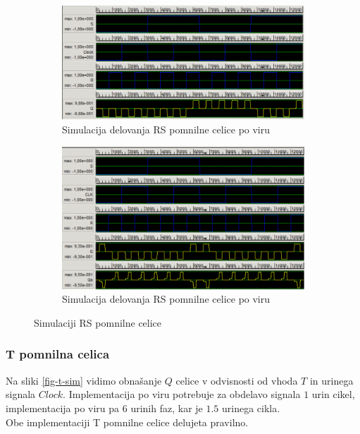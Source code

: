 \documentclass[a4paper, 11pt]{article}
\begin{document}
\begin{figure}[h!]
	\begin{subfigure}[b]{\textwidth}
	\includegraphics[width=\textwidth]{../img/vir_4/sim_sr.png}
	\caption{Simulacija delovanja RS pomnilne celice po viru \cite{quantum_dot}}
	\label{fig-rs-1-sim}
	\end{subfigure}
	\begin{subfigure}[b]{\textwidth}
	\includegraphics[width=\textwidth]{../img/vir_5/sim_rs.png}
	\caption{Simulacija delovanja RS pomnilne celice po viru \cite{a_novel_approach}}
	\label{fig-rs-2-sim}
	\end{subfigure}
	\caption{Simulaciji RS pomnilne celice}
	\label{fig-rs-sim}
\end{figure}

\subsubsection{T pomnilna celica}
Na sliki \ref{fig-t-sim} vidimo obnašanje $Q$ celice v odvisnosti od vhoda $T$ in urinega signala $Clock$.
Implementacija po viru \cite{quantum_dot} potrebuje za obdelavo signala $1$ urin cikel, implementacija po viru \cite{a_novel_approach} pa $6$ urinih faz, kar je $1.5$ urinega cikla.\\
Obe implementaciji T pomnilne celice delujeta pravilno.
\end{document}
